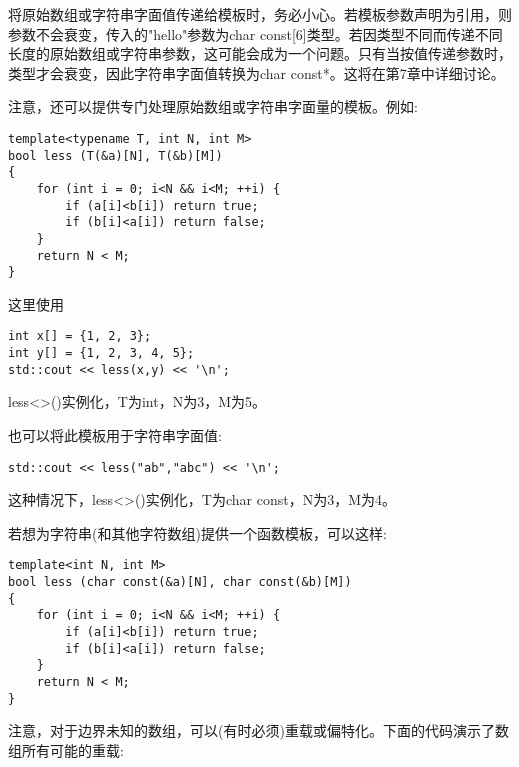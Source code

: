 将原始数组或字符串字面值传递给模板时，务必小心。若模板参数声明为引用，则参数不会衰变，传入的"hello"参数为char const[6]类型。若因类型不同而传递不同长度的原始数组或字符串参数，这可能会成为一个问题。只有当按值传递参数时，类型才会衰变，因此字符串字面值转换为char const*。这将在第7章中详细讨论。

注意，还可以提供专门处理原始数组或字符串字面量的模板。例如:

\begin{lstlisting}[style=styleCXX]
template<typename T, int N, int M>
bool less (T(&a)[N], T(&b)[M])
{
	for (int i = 0; i<N && i<M; ++i) {
		if (a[i]<b[i]) return true;
		if (b[i]<a[i]) return false;
	}
	return N < M;
}
\end{lstlisting}

这里使用

\begin{lstlisting}[style=styleCXX]
int x[] = {1, 2, 3};
int y[] = {1, 2, 3, 4, 5};
std::cout << less(x,y) << '\n';
\end{lstlisting}

less<>()实例化，T为int，N为3，M为5。

也可以将此模板用于字符串字面值:

\begin{lstlisting}[style=styleCXX]
std::cout << less("ab","abc") << '\n';
\end{lstlisting}

这种情况下，less<>()实例化，T为char const，N为3，M为4。

若想为字符串(和其他字符数组)提供一个函数模板，可以这样:

\begin{lstlisting}[style=styleCXX]
template<int N, int M>
bool less (char const(&a)[N], char const(&b)[M])
{
	for (int i = 0; i<N && i<M; ++i) {
		if (a[i]<b[i]) return true;
		if (b[i]<a[i]) return false;
	}
	return N < M;
}
\end{lstlisting}

注意，对于边界未知的数组，可以(有时必须)重载或偏特化。下面的代码演示了数组所有可能的重载:

